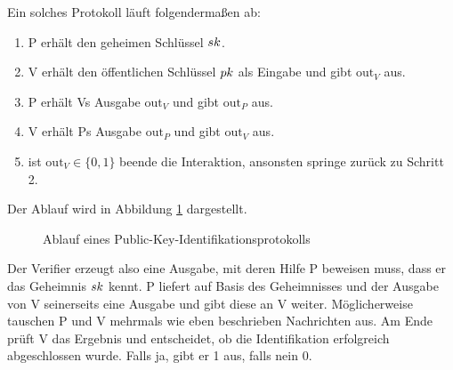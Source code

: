 Ein solches Protokoll läuft folgendermaßen ab:

\begin{enumerate}
  \item P erhält den geheimen Schlüssel $sk$.
  \item V erhält den öffentlichen Schlüssel $pk$ als Eingabe und
    gibt $\mathrm{out}_V$ aus.
  \item P erhält Vs Ausgabe $\mathrm{out}_V$ und gibt $\mathrm{out}_P$ aus.
  \item V erhält Ps Ausgabe $\mathrm{out}_P$ und gibt $\mathrm{out}_V$
    aus.
  \item ist $\mathrm{out}_V \in \{0,1\}$ beende die Interaktion,
    ansonsten springe zurück zu Schritt 2.
\end{enumerate} 

Der Ablauf wird in Abbildung \ref{fig:pki-identifikation} dargestellt.  

\begin{figure}[h]
\begin{center}
  \caption{Ablauf eines Public-Key-Identifikationsprotokolls}
  \label{fig:pki-identifikation}
\end{center}
\end{figure}


Der Verifier erzeugt also eine Ausgabe, mit deren Hilfe
P beweisen muss, dass er das Geheimnis $sk$ kennt. P liefert auf Basis
des Geheimnisses und der Ausgabe von V seinerseits eine Ausgabe und gibt
diese an V weiter. Möglicherweise tauschen P und V mehrmals wie eben
beschrieben Nachrichten aus. Am Ende prüft V das Ergebnis und
entscheidet, ob die Identifikation erfolgreich abgeschlossen wurde. Falls ja,
gibt er 1 aus, falls nein 0. 

